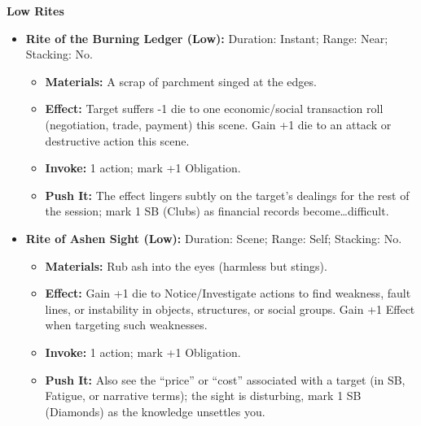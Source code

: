 \documentclass[11pt,letterpaper]{article}
\newcommand{\patronbox}[1]{\noindent\textbf{#1}\\}
\begin{document}
\patronbox{Low Rites}
\begin{itemize}[leftmargin=*]
    \item \textbf{Rite of the Burning Ledger (Low):} Duration: Instant; Range: Near; Stacking: No.
    \begin{itemize}
        \item \textbf{Materials:} A scrap of parchment singed at the edges.
        \item \textbf{Effect:} Target suffers -1 die to one economic/social transaction roll (negotiation, trade, payment) this scene. Gain +1 die to an attack or destructive action this scene.
        \item \textbf{Invoke:} 1 action; mark +1 Obligation.
        \item \textbf{Push It:} The effect lingers subtly on the target's dealings for the rest of the session; mark 1 SB (Clubs) as financial records become\dots difficult.
    \end{itemize}
    \item \textbf{Rite of Ashen Sight (Low):} Duration: Scene; Range: Self; Stacking: No.
    \begin{itemize}
        \item \textbf{Materials:} Rub ash into the eyes (harmless but stings).
        \item \textbf{Effect:} Gain +1 die to Notice/Investigate actions to find weakness, fault lines, or instability in objects, structures, or social groups. Gain +1 Effect when targeting such weaknesses.
        \item \textbf{Invoke:} 1 action; mark +1 Obligation.
        \item \textbf{Push It:} Also see the ``price'' or ``cost'' associated with a target (in SB, Fatigue, or narrative terms); the sight is disturbing, mark 1 SB (Diamonds) as the knowledge unsettles you.
    \end{itemize}
\end{itemize}
\end{document}
